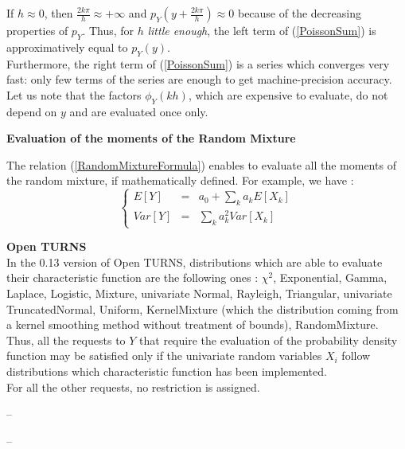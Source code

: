 {  If $h \approx 0$, then  $\frac{2k\pi}{h} \approx +\infty$ and $p_Y(y+\frac{2k\pi}{h})  \approx 0$ because of the decreasing properties of $p_Y$. Thus, for $h$ \emph{little enough}, the left term of (\ref{PoissonSum}) is approximatively equal to $p_Y(y)$.\\
  Furthermore, the right term of (\ref{PoissonSum}) is a series which converges very fast: only few terms of the series are enough to get machine-precision accuracy. Let us note that the factors $\phi_Y(kh)$, which are expensive to evaluate, do not depend on $y$ and are evaluated once only.\\
  \vspace*{2mm}

  {\bf Evaluation of the moments of the Random Mixture}

  The relation (\ref{RandomMixtureFormula}) enables to evaluate all the moments of the random mixture, if mathematically defined. For example, we have :
  $$
  \left\{
    \begin{array}{lcl}
      E[Y] & = & a_0 + \sum_k a_k E[X_k] \\
      Var[Y] & = &  \sum_k a_k^2 Var[X_k]
    \end{array}
  \right.
  $$


  {\bf Open TURNS}\\
  In the 0.13 version of Open TURNS, distributions which are able to evaluate their characteristic function are the following ones :  $\chi^2$, Exponential, Gamma,  Laplace, Logistic, Mixture, univariate Normal, Rayleigh, Triangular, univariate TruncatedNormal, Uniform, KernelMixture (which the distribution coming from a kernel smoothing method without treatment of bounds), RandomMixture.\\
  Thus, all the requests to $Y$ that require the evaluation of the probability density function may be satisfied only if the univariate random variables $X_i$ follow distributions which characteristic function has been implemented.\\

  For all the other requests, no restriction is assigned.
}
{
  --
}


{
  --
}


